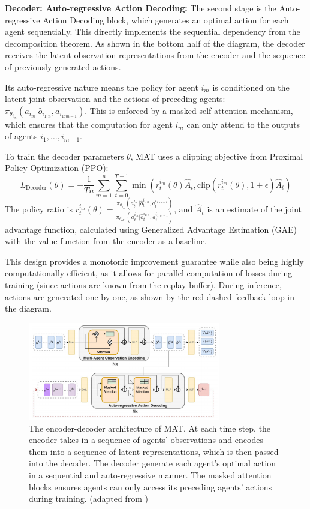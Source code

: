 \textbf{Decoder: Auto-regressive Action Decoding:} The second stage is the Auto-regressive Action Decoding block, which generates an optimal action for each agent sequentially. This directly implements the sequential dependency from the decomposition theorem. As shown in the bottom half of the diagram, the decoder receives the latent observation representations from the encoder and the sequence of previously generated actions.

Its auto-regressive nature means the policy for agent $i_m$ is conditioned on the latent joint observation and the actions of preceding agents: $\pi_{\theta_{i_m}}(a_{i_m} | \hat{o}_{i_{1:n}}, a_{i_{1:m-1}})$. This is enforced by a masked self-attention mechanism, which ensures that the computation for agent $i_m$ can only attend to the outputs of agents $i_1, \dots, i_{m-1}$.

To train the decoder parameters $\theta$, MAT uses a clipping objective from Proximal Policy Optimization (PPO):
\begin{equation}
    \label{eq:mat_decoder_loss}
    L_{\text{Decoder}}(\theta) = -\frac{1}{Tn} \sum_{m=1}^{n} \sum_{t=0}^{T-1} \min \left( r_t^{i_m}(\theta)\hat{A}_t, \text{clip}(r_t^{i_m}(\theta), 1 \pm \epsilon)\hat{A}_t \right)
\end{equation}
The policy ratio is $r_t^{i_m}(\theta) = \frac{\pi_{\theta_{i_m}}(a_{t}^{i_m} | \hat{o}_{t}^{i_{1:n}}, a_{t}^{i_{1:m-1}})}{\pi_{\theta_{\text{old}}}(a_{t}^{i_m} | \hat{o}_{t}^{i_{1:n}}, a_{t}^{i_{1:m-1}})}$, and $\hat{A}_t$ is an estimate of the joint advantage function, calculated using Generalized Advantage Estimation (GAE) with the value function from the encoder as a baseline.

This design provides a monotonic improvement guarantee while also being highly computationally efficient, as it allows for parallel computation of losses during training (since actions are known from the replay buffer). During inference, actions are generated one by one, as shown by the red dashed feedback loop in the diagram.

\begin{figure}[H]
  \centering
 \includegraphics[width=0.75\textwidth]{img_pfe/MAT_arch.PNG}
  \caption{The encoder-decoder architecture of MAT. At each time step, the encoder takes in a sequence of
agents’ observations and encodes them into a sequence of latent representations, which is then passed into
the decoder. The decoder generate each agent’s optimal action in a sequential and auto-regressive manner.
The masked attention blocks ensures agents can only access its preceding agents’ actions during training. (adapted from \parencite{MAT} )}
\label{fig:mat_architecture}
\end{figure}
\FloatBarrier

